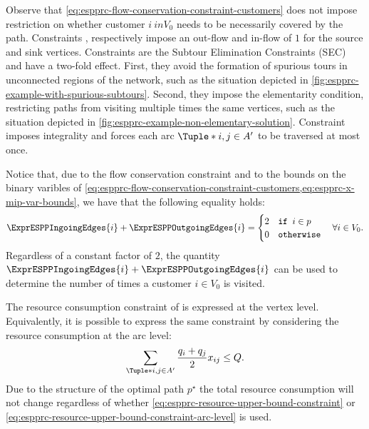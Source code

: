 Observe that \cref{eq:espprc-flow-conservation-constraint-customers} does not impose
restriction on whether customer $i \ in V_0$ needs to be necessarily covered by the path.
Constraints , 
respectively impose an out-flow and in-flow of $1$ for the source and sink vertices.
Constraints  are the Subtour Elimination Constraints (SEC) and
have a two-fold effect.
First, they avoid the formation of spurious tours in unconnected regions of the network, such
as the situation depicted in \cref{fig:espprc-example-with-spurious-subtours}.
Second, they impose the elementarity condition, restricting paths from visiting multiple times
the same vertices, such as the situation depicted in \cref{fig:espprc-example-non-elementary-solution}.
Constraint  imposes integrality
and forces each arc $\Tuple*{i, j} \in A^\prime$ to be traversed at most once.

Notice that, due to the flow conservation constraint and to the bounds on the binary varibles of
\cref{eq:espprc-flow-conservation-constraint-customers,eq:espprc-x-mip-var-bounds},
we have that the following equality holds:
\begin{equation}
	\ExprESPPIngoingEdges{i} + \ExprESPPOutgoingEdges{i} = \begin{cases}
		2 & \texttt{if } i \in p \\
		0 & \texttt{otherwise}
	\end{cases}
	\quad \forall i \in V_0.
\end{equation}
Regardless of a constant factor of $2$,
the quantity $\ExprESPPIngoingEdges{i} + \ExprESPPOutgoingEdges{i}$
can be used to determine the number of times a  customer $i \in V_0$ is visited.

The resource consumption constraint of  is
expressed at the vertex level.
Equivalently, it is possible to express the same constraint by considering the resource consumption
at the arc level:
\begin{equation}
	\label{eq:espprc-resource-upper-bound-constraint-arc-level}
	\sum_{\Tuple*{i, j} \in A^\prime} \frac{q_i + q_j}{2} x_{ij} \le Q.
\end{equation}
Due to the structure of the optimal path $p^\star$ the total resource consumption
will not change regardless of whether
\cref{eq:espprc-resource-upper-bound-constraint} or \cref{eq:espprc-resource-upper-bound-constraint-arc-level}
is used.

